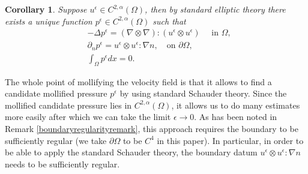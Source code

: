 \documentclass[12pt,a4paper]{article}
\newtheorem{corollary}[theorem]{Corollary}
\theoremstyle{definition}
\theoremstyle{remark}
\numberwithin{equation}{section}
\begin{document}
\begin{corollary}
Suppose $u^\epsilon \in C^{2, \alpha} (\Omega)$, then by standard elliptic theory there exists a unique function $p^\epsilon \in C^{2, \alpha} (\Omega)$ such that 
\begin{align}
&-\Delta p^\epsilon = (\nabla \otimes \nabla) : (u^\epsilon \otimes u^\epsilon) \quad \text{ in } \Omega, \\
&\partial_n p^\epsilon = u^\epsilon \otimes u^\epsilon : \nabla n, \quad \text{on } \partial \Omega, \label{mollifiedboundarycondition} \\
&\int_\Omega p^\epsilon dx = 0. 
\end{align}
\end{corollary}
The whole point of mollifying the velocity field is that it allows to find a candidate mollified pressure $p^\epsilon$ by using standard Schauder theory. Since the mollified candidate pressure lies in $C^{2, \alpha} (\Omega)$, it allows us to do many estimates more easily after which we can take the limit $\epsilon \rightarrow 0$. As has been noted in Remark \ref{boundaryregularityremark}, this approach requires the boundary to be sufficiently regular (we take $\partial \Omega$ to be $C^4$ in this paper). In particular, in order to be able to apply the standard Schauder theory, the boundary datum $u^\epsilon \otimes u^\epsilon : \nabla n$ needs to be sufficiently regular.
\end{document}

